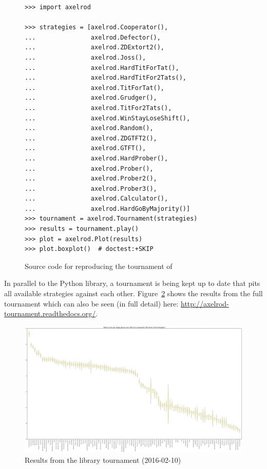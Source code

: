 \documentclass{article}
\begin{document}
\begin{figure}[!hbtp]
    \begin{verbatim}
>>> import axelrod

>>> strategies = [axelrod.Cooperator(),
...               axelrod.Defector(),
...               axelrod.ZDExtort2(),
...               axelrod.Joss(),
...               axelrod.HardTitForTat(),
...               axelrod.HardTitFor2Tats(),
...               axelrod.TitForTat(),
...               axelrod.Grudger(),
...               axelrod.TitFor2Tats(),
...               axelrod.WinStayLoseShift(),
...               axelrod.Random(),
...               axelrod.ZDGTFT2(),
...               axelrod.GTFT(),
...               axelrod.HardProber(),
...               axelrod.Prober(),
...               axelrod.Prober2(),
...               axelrod.Prober3(),
...               axelrod.Calculator(),
...               axelrod.HardGoByMajority()]
>>> tournament = axelrod.Tournament(strategies)
>>> results = tournament.play()
>>> plot = axelrod.Plot(results)
>>> plot.boxplot()  # doctest:+SKIP
    \end{verbatim}
    \caption{Source code for reproducing the tournament of \cite{Stewart2012}}
    \label{fig:stewart-code}
\end{figure}

In parallel to the Python library, a tournament is being kept up to date that
pits all available strategies against each other. Figure~\ref{fig:tournament}
shows the results from the full tournament which can also be seen (in full
detail) here: \url{http://axelrod-tournament.readthedocs.org/}.

\begin{figure}[!hbtp]
	\centering
	\includegraphics[width=.9\textwidth]{../img/tournament.pdf}
	\caption{Results from the library tournament (2016-02-10)}
	\label{fig:tournament}
\end{figure}
\end{document}
